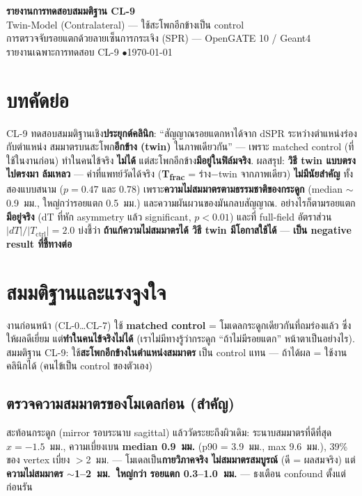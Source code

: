 \documentclass[16pt]{extarticle}
\begin{document}
\begin{center}
{\LARGE\bfseries\color{theme} รายงานการทดสอบสมมติฐาน CL-9}\\[3pt]
{\Large Twin-Model (Contralateral) --- ใช้สะโพกอีกข้างเป็น control}\\[5pt]
{\small การตรวจจับรอยแตกด้วยลายเซ็นการกระเจิง (SPR) --- OpenGATE 10 / Geant4}\\
{\small รายงานเฉพาะการทดสอบ CL-9 \quad$\bullet$\quad \today}
\end{center}
\vspace{2pt}{\color{theme!45}\hrule}\vspace{8pt}

\section*{บทคัดย่อ}
CL-9 ทดสอบสมมติฐานเชิง\textbf{ประยุกต์คลินิก}: ``สัญญาณรอยแตกหาได้จาก dSPR ระหว่างตำแหน่งร่องกับตำแหน่ง
สมมาตรบนสะโพก\textbf{อีกข้าง (twin)} ในภาพเดียวกัน'' --- เพราะ matched control (ที่ใช้ในงานก่อน) ทำในคนไข้จริง
\textbf{ไม่ได้} แต่สะโพกอีกข้าง\textbf{มีอยู่ในฟิล์มจริง}. ผลสรุป: \textcolor{bad}{\textbf{วิธี twin แบบตรงไปตรงมา
ล้มเหลว}} --- ค่าที่แพทย์วัดได้จริง (\textbf{T\textsubscript{frac}} = ร่าง$-$twin จากภาพเดียว) \textbf{ไม่มีนัยสำคัญ}
ทั้งสองแบบสนาม ($p=0.47$ และ $0.78$) เพราะ\textbf{ความไม่สมมาตรตามธรรมชาติของกระดูก} (median $\sim$0.9~มม.,
ใหญ่กว่ารอยแตก 0.5~มม.) และความผันผวนของมันกลบสัญญาณ. อย่างไรก็ตามรอยแตก\textbf{มีอยู่จริง} (dT ที่หัก
asymmetry แล้ว significant, $p<0.01$) และที่ full-field อัตราส่วน $|dT|/|T_{\text{ctrl}}|=2.0$ บ่งชี้ว่า
\textbf{ถ้าแก้ความไม่สมมาตรได้ วิธี twin มีโอกาสใช้ได้} --- \textbf{เป็น negative result ที่ชี้ทางต่อ}

\section{สมมติฐานและแรงจูงใจ}
งานก่อนหน้า (CL-0…CL-7) ใช้ \textbf{matched control} = โมเดลกระดูกเดียวกันที่ถมร่องแล้ว ซึ่งให้ผลดีเยี่ยม
แต่\textbf{ทำในคนไข้จริงไม่ได้} (เราไม่มีทางรู้ว่ากระดูก ``ถ้าไม่มีรอยแตก'' หน้าตาเป็นอย่างไร). สมมติฐาน CL-9:
ใช้\textbf{สะโพกอีกข้างในตำแหน่งสมมาตร} เป็น control แทน --- ถ้าได้ผล = ใช้งานคลินิกได้ (คนไข้เป็น control ของตัวเอง)

\subsection{ตรวจความสมมาตรของโมเดลก่อน (สำคัญ)}
สะท้อนกระดูก (mirror รอบระนาบ sagittal) แล้ววัดระยะถึงผิวเดิม: ระนาบสมมาตรที่ดีที่สุด $x=-1.5$~มม.,
ความเบี่ยงเบน \textbf{median 0.9~มม.} (p90 = 3.9~มม., max 9.6~มม.), 39\% ของ vertex เบี่ยง $>$2~มม. ---
โมเดลเป็น\textbf{กายวิภาคจริง ไม่สมมาตรสมบูรณ์} (ดี = ผลสมจริง) แต่\textbf{ความไม่สมมาตร $\sim$1--2~มม.\ ใหญ่กว่า
รอยแตก 0.3--1.0~มม.} --- ธงเตือน confound ตั้งแต่ก่อนรัน
\end{document}
